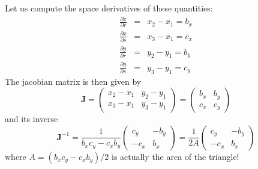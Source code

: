 Let us compute the space derivatives of these quantities:
\begin{eqnarray}
\frac{\partial x}{\partial r} &=& x_2-x_1=b_x \nonumber\\
\frac{\partial x}{\partial s} &=& x_3-x_1=c_x \nonumber\\
\frac{\partial y}{\partial r} &=& y_2-y_1=b_y \nonumber\\
\frac{\partial y}{\partial s} &=& y_3-y_1=c_y \nonumber
\end{eqnarray}
The jacobian matrix is then given by
\[
{\bm J} = \left(
\begin{array}{cc}
x_2-x_1 & y_2-y_1 \\
x_3-x_1 & y_3-y_1
\end{array}
\right)
= \left(
\begin{array}{cc}
b_x & b_y \\
c_x & c_y
\end{array}
\right)
\]
and its inverse
\[
{\bm J}^{-1} 
= \frac{1}{b_xc_y-c_xb_y}
\left(
\begin{array}{cc}
c_y& -b_y \\
-c_x & b_x
\end{array}
\right)
=
\frac{1}{2A}
\left(
\begin{array}{cc}
c_y& -b_y \\
-c_x & b_x
\end{array}
\right)
\]
where $A=(b_xc_y-c_xb_y)/2$ is actually the area of the triangle!


